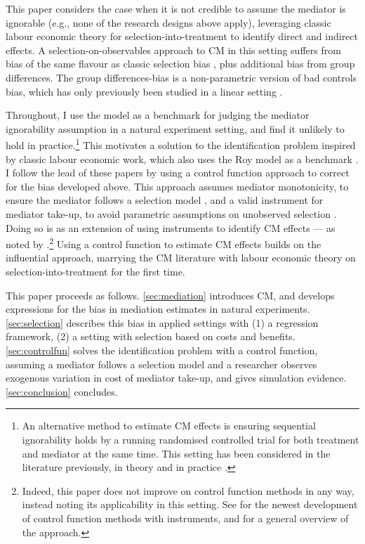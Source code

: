 This paper considers the case when it is not credible to assume the mediator is ignorable (e.g., none of the research designs above apply), leveraging classic labour economic theory for selection-into-treatment to identify direct and indirect effects.
A selection-on-observables approach to CM in this setting suffers from bias of the same flavour as classic selection bias \citep{heckman1998characterizing}, plus additional bias from group differences.
The group differences-bias is a non-parametric version of bad controls bias, which has only previously been studied in a linear setting \citep{cinelli2024crash,ding2015adjust}.

Throughout, I use the \cite{roy1951some} model as a benchmark for judging the \cite{imai2010identification} mediator ignorability assumption in a natural experiment setting, and find it unlikely to hold in practice.\footnote{
    An alternative method to estimate CM effects is ensuring sequential ignorability holds by a running randomised controlled trial for both treatment and mediator at the same time.
    This setting has been considered in the literature previously, in theory \citep{imai2013experimental} and in practice \citep{ludwig2011mechanism}.
}
This motivates a solution to the identification problem inspired by classic labour economic work, which also uses the Roy model as a benchmark \citep{heckman1979sample,heckman1990empirical}.
I follow the lead of these papers by using a control function approach to correct for the bias developed above.
This approach assumes mediator monotonicity, to ensure the mediator follows a selection model \citep{vytlacil2002independence}, and a valid instrument for mediator take-up, to avoid parametric assumptions on unobserved selection \citep{heckman2004using}.
Doing so is as an extension of using instruments to identify CM effects --- as noted by \cite{frolich2017direct}.\footnote{
    Indeed, this paper does not improve on control function methods in any way, instead noting its applicability in this setting.
    See \cite{frolich2017direct} for the newest development of control function methods with instruments, and \cite{imbens2007nonadditive} for a general overview of the approach.
}
Using a control function to estimate CM effects builds on the influential \cite{imai2010identification} approach, marrying the CM literature with labour economic theory on selection-into-treatment for the first time. 

This paper proceeds as follows.
\autoref{sec:mediation} introduces CM, and develops expressions for the bias in mediation estimates in natural experiments.
\autoref{sec:selection} describes this bias in applied settings with (1) a regression framework, (2) a setting with selection based on costs and benefits.
\autoref{sec:controlfun} solves the identification problem with a control function, assuming a mediator follows a selection model and a researcher observes exogenous variation in cost of mediator take-up, and gives simulation evidence.
\autoref{sec:conclusion} concludes.
